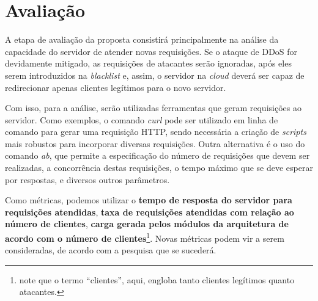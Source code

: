 \documentclass[a4paper, 11pt]{article}
\begin{document}


\section{Avalia\c{c}\~{a}o}
A etapa de avalia\c{c}\~{a}o da proposta consistirá principalmente na análise
da capacidade do servidor de atender novas requisições. Se o ataque de DDoS for devidamente
mitigado, as requisições de atacantes serão ignoradas, após eles serem introduzidos na \emph{blacklist}
e, assim, o servidor na \emph{cloud} deverá ser capaz de redirecionar apenas clientes legítimos 
para o novo servidor.

Com isso, para a análise, serão utilizadas ferramentas que geram requisições ao servidor. Como exemplos, o comando 
\emph{curl} pode ser utilizado em linha de comando para gerar uma requisição HTTP, sendo necessária a criação de \emph{scripts} mais robustos para incorporar diversas requisições. Outra alternativa é o uso do comando \emph{ab}, que permite a especificação do número de requisições que devem ser realizadas, a concorrência destas requisições, o tempo máximo que se deve esperar por respostas, e diversos outros parâmetros.

Como métricas, podemos utilizar o \textbf{tempo de resposta do servidor para requisições atendidas}, \textbf{taxa de requisições atendidas com relação ao número de clientes}, \textbf{carga gerada pelos módulos da arquitetura de acordo com o número de clientes}\footnote{note que o termo ``clientes'', aqui, engloba tanto clientes legítimos quanto atacantes.}. Novas métricas podem vir a serem consideradas, de acordo com a pesquisa que se sucederá.
\end{document}
